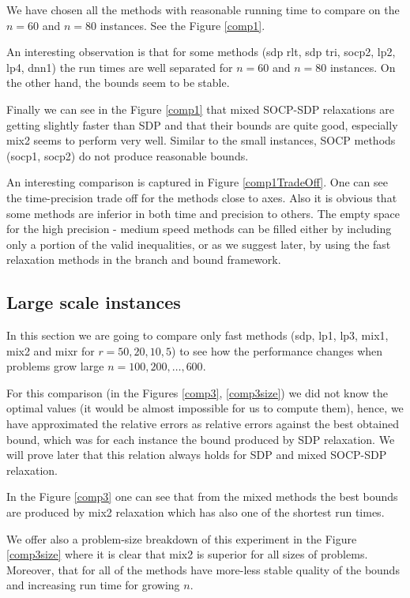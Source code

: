\documentclass[12pt]{book}
\theoremstyle{definition}
\begin{document}
We have chosen all the methods with reasonable running time to compare on the $n=60$ and $n=80$ instances. See the Figure \ref{comp1}.

An interesting observation is that for some methods (sdp rlt, sdp tri, socp2, lp2, lp4, dnn1) the run times are well separated for $n=60$ and $n=80$ instances. On the other hand, the bounds seem to be stable.

Finally we can see in the Figure \ref{comp1} that mixed SOCP-SDP relaxations are getting slightly faster than SDP and that their bounds are quite good, especially mix2 seems to perform very well. 
Similar to the small instances, SOCP methods (socp1, socp2) do not produce reasonable bounds. 

An interesting comparison is captured in Figure \ref{comp1TradeOff}.
One can see the time-precision trade off for the methods close to axes. Also it is obvious that some methods are inferior in both time and precision to others.
The empty space for the high precision - medium speed methods can be filled either by including only a portion of the valid inequalities, or as we suggest later, by using the fast relaxation methods in the branch and bound framework.




\subsection{Large scale instances}

In this section we are going to compare only fast methods (sdp, lp1, lp3, mix1, mix2 and  mixr for $r=50,20,10,5$) to see how the performance changes when problems grow large $n=100, 200, \dots ,600$.

For this comparison (in the Figures \ref{comp3}, \ref{comp3size}) we did not know the optimal values (it would be almost impossible for us to compute them), hence, we have approximated the relative errors as relative errors against the best obtained bound, which was for each instance the bound produced by SDP relaxation. We will prove later that this relation always holds for SDP and mixed SOCP-SDP relaxation.

In the Figure \ref{comp3} one can see that from the mixed methods the best bounds are produced by mix2 relaxation which has also one of the shortest run times. 


We offer also a problem-size breakdown of this experiment in the Figure \ref{comp3size} where it is clear that mix2 is superior for all sizes of problems. Moreover, that for all of the methods have more-less stable quality of the bounds and increasing run time for growing $n$.
\end{document}
